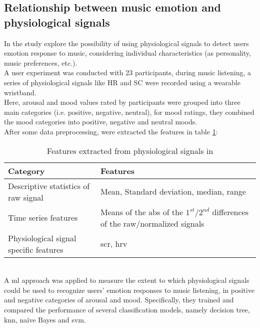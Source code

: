 \subsection{Relationship between music emotion and physiological signals}
In \cite{hu2018relationships} the study explore the possibility of using physiological signals to detect users emotion response to music, considering individual characteristics (as personality, music preferences, etc.).
\\ \indent
A user experiment was conducted with 23 participants, during music listening, a series of physiological signals like HR and SC were recorded using a wearable wristband.
\\ Here, arousal and mood values rated by participants were grouped into three main categories (i.e. positive, negative, neutral), for mood ratings, they combined the mood categories into positive, negative and neutral moods.
\\
After some data preprocessing, were extracted the features in table \ref{table:features_hu2018}:
\begin{table}[h!]
	\centering
	\begin{tabular}{|p{}|p{}|}
		\hline
		Category & Features\\ [0.5ex] 
		\hline \hline Descriptive statistics of raw signal & Mean, Standard deviation, median, range \\
		\hline Time series features & Means of the abs of the $1^{st}$/$2^{nd}$ differences of the raw/normalized signals \\
		\hline Physiological signal specific features & \gls{scr}, \gls{hrv} \\
		\hline
	\end{tabular}
	\caption{Features extracted from physiological signals in \cite{hu2018relationships}}
	\label{table:features_hu2018}
\end{table}
\\
A \gls{ml} approach was applied to measure the extent to which physiological signals could be used to recognize users’ emotion responses to music listening, in positive and negative categories of arousal and mood. Specifically, they trained and compared the performance of several classification models, namely decision tree, \gls{knn}, naïve Bayes and \gls{svm}.

